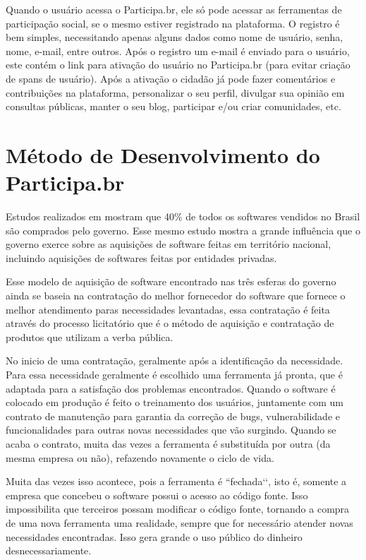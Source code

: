 Quando o usuário acessa o Participa.br, ele só pode acessar as ferramentas de participação social, se o mesmo estiver registrado na plataforma. O registro é bem simples, necessitando apenas alguns dados como nome de usuário, senha, nome, e-mail, entre outros. Após o registro um e-mail é enviado para o usuário, este contém o link para ativação do usuário no Participa.br (para evitar criação de spans de usuário). Após a ativação o cidadão já pode fazer comentários e contribuições na plataforma, personalizar o seu perfil, divulgar sua opinião em consultas públicas, manter o seu blog, participar e/ou criar comunidades, etc.

\section{Método de Desenvolvimento do Participa.br}

Estudos realizados em \cite{ferreira2008software} mostram que 40\% de todos os softwares vendidos no Brasil são comprados pelo governo. Esse mesmo estudo mostra a grande influência que o governo exerce sobre as aquisições de software feitas em território nacional, incluindo aquisições de softwares feitas por entidades privadas.

Esse modelo de aquisição de software encontrado nas três esferas do governo ainda se baseia na contratação do melhor fornecedor do software que fornece o melhor atendimento paras necessidades levantadas, essa contratação é feita através do processo licitatório que é o método de aquisição e contratação de produtos que utilizam a verba pública. 

No inicio de uma contratação, geralmente após a identificação da necessidade. Para essa necessidade geralmente é escolhido uma ferramenta já pronta, que é adaptada para a satisfação dos problemas encontrados. Quando o software é colocado em produção é feito o treinamento dos usuários, juntamente com um contrato de manutenção para garantia da correção de bugs, vulnerabilidade e funcionalidades para outras novas necessidades que vão surgindo. Quando se acaba o contrato, muita das vezes a ferramenta é substituída por outra (da mesma empresa ou não), refazendo novamente o ciclo de vida.

Muita das vezes isso acontece, pois a ferramenta é ``fechada‘‘, isto é, somente a empresa que concebeu o software possui o acesso ao código fonte. Isso impossibilita que terceiros possam modificar o código fonte, tornando a compra de uma nova ferramenta uma realidade, sempre que for necessário atender novas necessidades encontradas. Isso gera grande o uso público do dinheiro desnecessariamente.

